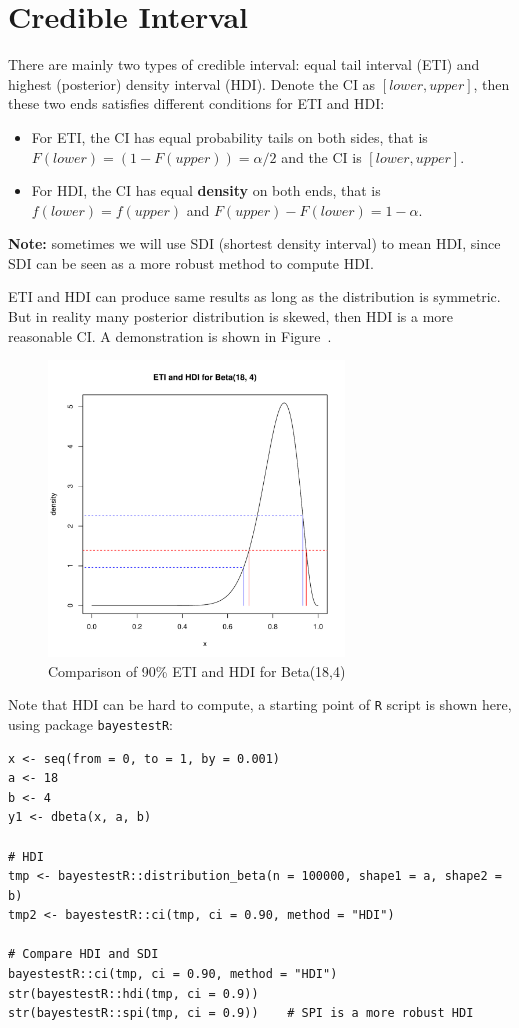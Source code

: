\documentclass[a4paper,12pt]{article}
\begin{document}
\section{Credible Interval}
\label{sec:credible-interval}

There are mainly two types of credible interval: equal tail interval (ETI) and highest (posterior) density interval (HDI). Denote the CI as $[lower, upper]$, then these two ends satisfies different conditions for ETI and HDI:
\begin{itemize}
\item For ETI, the CI has equal probability tails on both sides, that is $F\left(lower\right) = (1 - F(upper)) = \alpha / 2$ and the CI is $[lower, upper]$.
\item For HDI, the CI has equal \textbf{density} on both ends, that is $f\left(lower\right) = f\left(upper\right)$ and $F\left(upper\right) - F\left(lower\right) = 1 - \alpha$. 
\end{itemize}
\textbf{Note:} sometimes we will use SDI (shortest density interval) to mean HDI, since SDI can be seen as a more robust method to compute HDI\citep{Liu2015p809-819}.
\par
ETI and HDI can produce same results as long as the distribution is symmetric. But in reality many posterior distribution is skewed, then HDI is a more reasonable CI. A demonstration is shown in Figure~.
\begin{figure}[htbp]
  \centering
  \includegraphics[width = 0.7\textwidth]{figs/eti_and_hdi}
  \caption{Comparison of 90\% ETI and HDI for Beta(18,4)}
  \label{fig:eti_and_hdi}
\end{figure}
Note that HDI can be hard to compute, a starting point of \texttt{R} script is shown here, using package
\texttt{bayestestR}:
\begin{verbatim}
x <- seq(from = 0, to = 1, by = 0.001)
a <- 18
b <- 4
y1 <- dbeta(x, a, b)

# HDI
tmp <- bayestestR::distribution_beta(n = 100000, shape1 = a, shape2 = b)
tmp2 <- bayestestR::ci(tmp, ci = 0.90, method = "HDI")

# Compare HDI and SDI
bayestestR::ci(tmp, ci = 0.90, method = "HDI")
str(bayestestR::hdi(tmp, ci = 0.9))
str(bayestestR::spi(tmp, ci = 0.9))    # SPI is a more robust HDI
\end{verbatim}
\end{document}
